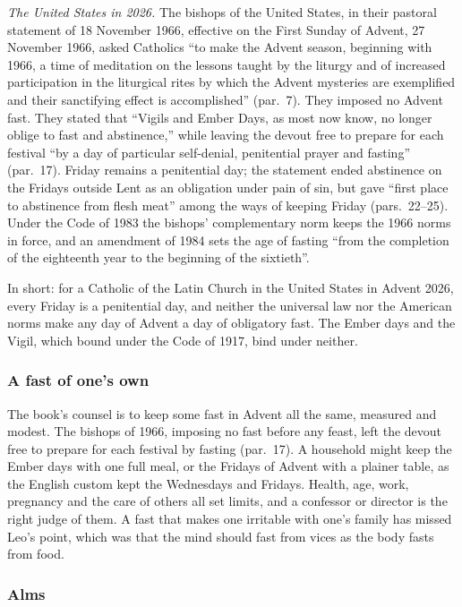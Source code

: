 \textit{The United States in 2026.} The bishops of the United States, in their pastoral statement of
18 November 1966, effective on the First Sunday of Advent, 27 November 1966, asked Catholics ``to
make the Advent season, beginning with 1966, a time of meditation on the lessons taught by the
liturgy and of increased participation in the liturgical rites by which the Advent mysteries are
exemplified and their sanctifying effect is accomplished'' (par.~7). They imposed no Advent fast.
They stated that ``Vigils and Ember Days, as most now know, no longer oblige to fast and
abstinence,'' while leaving the devout free to prepare for each festival ``by a day of particular
self-denial, penitential prayer and fasting'' (par.~17). Friday remains a penitential day; the
statement ended abstinence on the Fridays outside Lent as an obligation under pain of sin, but
gave ``first place to abstinence from flesh meat'' among the ways of keeping Friday (pars.~22--25).
Under the Code of 1983 the bishops' complementary norm keeps the 1966 norms in force, and an
amendment of 1984 sets the age of fasting ``from the completion of the eighteenth year to the
beginning of the sixtieth''.

In short: for a Catholic of the Latin Church in the United States in Advent 2026, every Friday is
a penitential day, and neither the universal law nor the American norms make any day of Advent a
day of obligatory fast. The Ember days and the Vigil, which bound under the Code of 1917, bind
under neither.

\subsubsection{A fast of one's own}

The book's counsel is to keep some fast in Advent all the same, measured and modest. The bishops
of 1966, imposing no fast before any feast, left the devout free to prepare for each festival by
fasting (par.~17). A household might keep the Ember days with one full meal,
or the Fridays of Advent with a plainer table, as the English custom kept the Wednesdays and
Fridays. Health, age, work, pregnancy and the care of others all set limits, and a confessor or
director is the right judge of them. A fast that makes one irritable with one's family has missed
Leo's point, which was that the mind should fast from vices as the body fasts from food.

\subsubsection{Alms}

